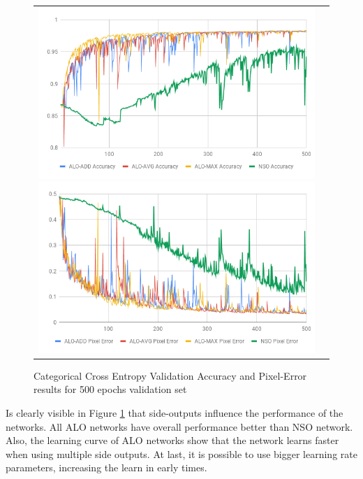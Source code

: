 \begin{figure}
  \caption{Categorical Cross Entropy Validation Accuracy and Pixel-Error results for 500 epochs validation set}
  \centering
  \begin{tabular}{ll}
    \includegraphics[width=1.\columnwidth]{figures/falreis/val_acc_500_epochs.png}
  
    \includegraphics[width=1.\columnwidth]{figures/falreis/pixel_error_500_epochs.png}
  \end{tabular}%
  \label{fig:val_acc_500_epochs}
\end{figure}

Is clearly visible in Figure \ref{fig:val_acc_500_epochs} that side-outputs influence the performance of the networks. All ALO networks have overall performance better than NSO network. Also, the learning curve of ALO networks show that the network learns faster when using multiple side outputs. At last, it is possible to use bigger learning rate parameters, increasing the learn in early times.

